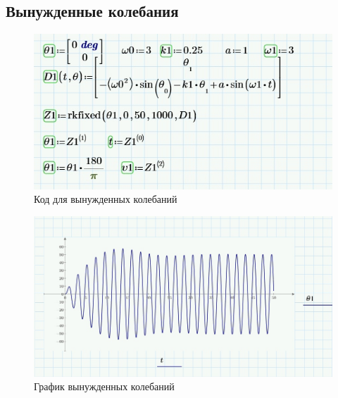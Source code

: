 \documentclass[a4paper, 14pt]{extarticle}
\begin{document}
	\subsection{Вынужденные колебания}
		\begin{figure}[H]
			\centering
			\includegraphics[width = .7\linewidth]{21.jpg}
			\caption[.] {Код для вынужденных колебаний}
		\end{figure}	
		\begin{figure}[H]
			\centering
			\includegraphics[width = \linewidth]{17.jpg}
			\caption[.] {График вынужденных колебаний}
		\end{figure}
\end{document}
